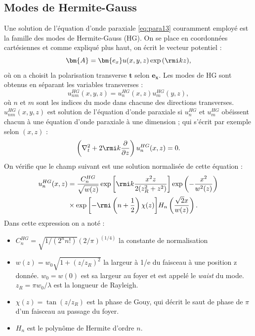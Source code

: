 \subsection{Modes de Hermite-Gauss}
\label{sec:HGmodes}
Une solution de l'équation d'onde paraxiale \ref{eq:para13} couramment employé est la famille des modes de Hermite-Gauss (HG). On se place en coordonnées cartésiennes et comme expliqué plus haut, on écrit le vecteur potentiel :
\begin{equation}
\bm{A}=\bm{e_x}u(x,y,z)\exp{(\rmi k z)},
\end{equation}
où on a choisit la polarisation transverse $\bm{t}$ selon $\bm{e_x}$. Les modes de HG sont obtenus en séparant les variables transverses :
\begin{equation}
u^{HG}_{nm}(x,y,z)=u^{HG}_{n}(x,z)u^{HG}_{m}(y,z),
\end{equation}
où $n$ et $m$ sont les indices du mode dans chacune des directions transverses. $u^{HG}_{nm}(x,y,z)$ est solution de l'équation d'onde paraxiale si $u^{HG}_{n}$ et $u^{HG}_{m}$ obéissent chacun à une équation d'onde paraxiale à une dimension ; qui s'écrit par exemple selon $(x,z)$ :
\begin{equation}
\left(\nabla_t^2 +2\rmi k\frac{\partial}{\partial z}\right)u^{HG}_{n}(x,z)=0.
\end{equation}
On vérifie que le champ suivant est une solution normalisée de cette équation  :
\begin{align}
u^{HG}_{n}(x,z)&=\frac{C_n^{HG}}{\sqrt{w(z)}}\exp{\left[\rmi k \frac{x^2 z}{2(z_R^2 + z^2)}\right]}\exp{\left(-\frac{x^2}{w^2(z)}\right)}\\
&\times \exp{\left[-\rmi\left(n+\frac{1}{2}\right)\chi(z)\right]}H_n\left(\frac{\sqrt{2}x}{w(z)}\right).
\label{eq:hgmodes}
\end{align}
Dans cette expression on a noté :
\begin{itemize}
\renewcommand{\labelitemi}{$\bullet$}
\setlength\itemsep{1em}

\item $C_n^{HG}=\sqrt{1/(2^n n!)}(2/\pi)^{(1/4)}$ la constante de normalisation
\item $w(z) = w_0 \sqrt{1+(z/z_R)^2}$ la largeur à 1/e du faisceau à une position z donnée. $w_0=w(0)$ est sa largeur au foyer et est appelé le \textit{waist} du mode. $z_R = \pi w_0/\lambda$ est la longueur de Rayleigh.
\item $\chi(z)=\tan{(z/z_R)}$ est la phase de Gouy, qui décrit le saut de phase de $\pi$ d'un faisceau au passage du foyer.
\item $H_n$ est le polynôme de Hermite d'ordre $n$.
\end{itemize}

